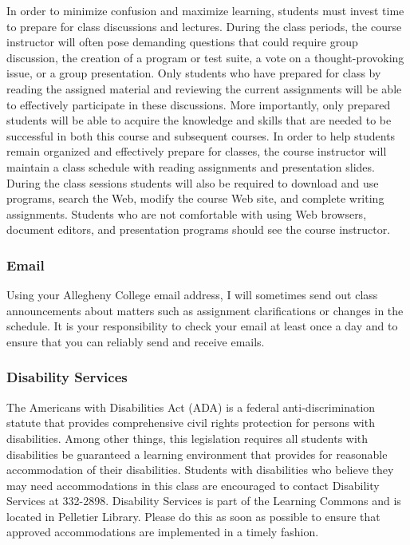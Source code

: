 In order to minimize confusion and maximize learning, students must invest time to prepare for class discussions and
lectures.  During the class periods, the course instructor will often pose demanding questions that could require group
discussion, the creation of a program or test suite, a vote on a thought-provoking issue, or a group presentation.
Only students who have prepared for class by reading the assigned material and reviewing the current assignments will be
able to effectively participate in these discussions.  More importantly, only prepared students will be able to acquire
the knowledge and skills that are needed to be successful in both this course and subsequent courses.  In order to help
students remain organized and effectively prepare for classes, the course instructor will maintain a class schedule with
reading assignments and presentation slides.   During the class sessions students will also be required to download and
use programs, search the Web, modify the course Web site, and complete writing assignments.  Students who are
not comfortable with using Web browsers, document editors, and presentation programs should see the course instructor.

\subsubsection*{Email}

Using your Allegheny College email address, I will sometimes send out class announcements about matters such as
assignment clarifications or changes in the schedule. It is your responsibility to check your email at least once a day
and to ensure that you can reliably send and receive emails.

\subsubsection*{Disability Services}

The Americans with Disabilities Act (ADA) is a federal anti-discrimination statute that provides comprehensive civil
rights protection for persons with disabilities.  Among other things, this legislation requires all students with
disabilities be guaranteed a learning environment that provides for reasonable accommodation of their disabilities.
Students with disabilities who believe they may need accommodations in this class are encouraged to contact Disability
Services at 332-2898.  Disability Services is part of the Learning Commons and is located in Pelletier Library.
Please do this as soon as possible to ensure that approved accommodations are implemented in a timely fashion.

